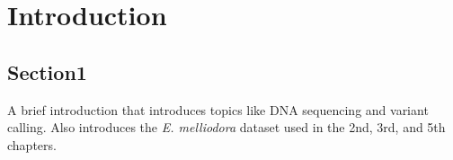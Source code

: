 \chapter{Introduction}
\section{Section1}

A brief introduction that introduces topics like DNA sequencing and variant calling. Also introduces the \textit{E. melliodora} dataset used in the 2nd, 3rd, and 5th chapters.
